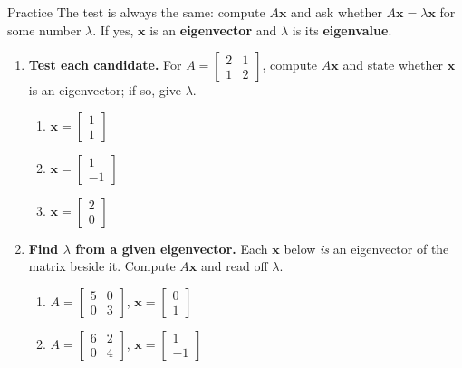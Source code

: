 \documentclass[10pt]{article}
\newcommand{\xx}{\mathbf{x}}
\begin{document}
\namedateperiod

\vspace{0.12in}

\begin{notesbox}{Practice}
The test is always the same: compute $A\xx$ and ask whether $A\xx=\lambda\xx$ for some number
$\lambda$. If yes, $\xx$ is an \textbf{eigenvector} and $\lambda$ is its \textbf{eigenvalue}.

\begin{enumerate}[leftmargin=1.9em, itemsep=12pt]
  \item \textbf{Test each candidate.} For $A=\begin{bmatrix} 2 & 1 \\ 1 & 2 \end{bmatrix}$, compute
        $A\xx$ and state whether $\xx$ is an eigenvector; if so, give $\lambda$.
    \begin{enumerate}[label=(\alph*), leftmargin=1.8em, itemsep=4pt]
      \item $\xx=\begin{bmatrix} 1 \\ 1 \end{bmatrix}$ \hfill
      \item $\xx=\begin{bmatrix} 1 \\ -1 \end{bmatrix}$ \hfill
      \item $\xx=\begin{bmatrix} 2 \\ 0 \end{bmatrix}$
    \end{enumerate}
    \vspace{1.2cm}
  \item \textbf{Find $\lambda$ from a given eigenvector.} Each $\xx$ below \emph{is} an eigenvector of
        the matrix beside it. Compute $A\xx$ and read off $\lambda$.
    \begin{enumerate}[label=(\alph*), leftmargin=1.8em, itemsep=4pt]
      \item $A=\begin{bmatrix} 5 & 0 \\ 0 & 3 \end{bmatrix}$, $\xx=\begin{bmatrix} 0 \\ 1 \end{bmatrix}$ \hfill
      \item $A=\begin{bmatrix} 6 & 2 \\ 0 & 4 \end{bmatrix}$, $\xx=\begin{bmatrix} 1 \\ -1 \end{bmatrix}$

\end{enumerate}
\end{enumerate}
\end{notesbox}
\end{document}
